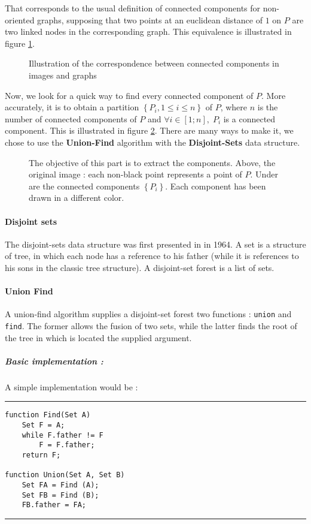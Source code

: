 \documentclass{article}
\newcommand{\imageWithoutFigure}[2] { \fbox {\imageWithoutFigureAndBox{#1}{#2} } }
\newcommand{\imageWithoutFigureAndBox}[2] { \texttt{[image: images/\#1]} }
\newcommand{\Figure}[3] { \begin{figure}[!ht] \centering{#1} \caption{#2 \label{#3} } \end{figure} }
\newcommand{\image}[4] { \Figure{\imageWithoutFigure{#1}{#2}} {#3} {#4} }
\begin{document}
That corresponds to the usual definition of connected components for non-oriented graphs,
supposing that two points at an euclidean distance of $1$ on $P$ are two linked nodes in the corresponding graph. This equivalence is illustrated in figure \ref{img_components_similitude}.

\image{disjointSets/components_similitude.png} 7 {Illustration of the correspondence between connected components in images and graphs} {img_components_similitude}

Now, we look for a quick way to find every connected component of $P$.
More accurately, it is to obtain a partition $\left\{ P_i , 1 \leq i \leq n \right\}$ of $P$, where $n$ is the number of connected components of $P$ and $\forall i \in [1; n],\; P_i$ is a connected component.
This is illustrated in figure \ref{img_components_extraction}.
There are many ways to make it, we chose to use the \textbf{Union-Find} algorithm with the \textbf{Disjoint-Sets} data structure.

\image{disjointSets/components_extraction.png} 7 {The objective of this part is to extract the components.
Above, the original image : each non-black point represents a point of $P$.
Under are the connected components $\left\{ P_i \right\}$. Each component has been drawn in a different color.} {img_components_extraction}

\paragraph{Disjoint sets}
The disjoint-sets data structure was first presented in \cite{Galler} in 1964.
A set is a structure of tree, in which each node has a reference to his father (while it is references to his sons in the classic tree structure).
A disjoint-set forest is a list of sets.

\paragraph{Union Find}
A union-find algorithm supplies a disjoint-set forest two functions : \verb|union| and \verb|find|. The former allows the fusion of two sets, while the latter finds the root of the tree in which is located the supplied argument.

\subparagraph{Basic implementation :}
A simple implementation would be :
\hrule
\begin{verbatim}
function Find(Set A)
    Set F = A;
    while F.father != F
        F = F.father;
    return F;

function Union(Set A, Set B)
    Set FA = Find (A);
    Set FB = Find (B);
    FB.father = FA;
\end{verbatim}
\hrule\vspace*{.5 cm}
\end{document}
